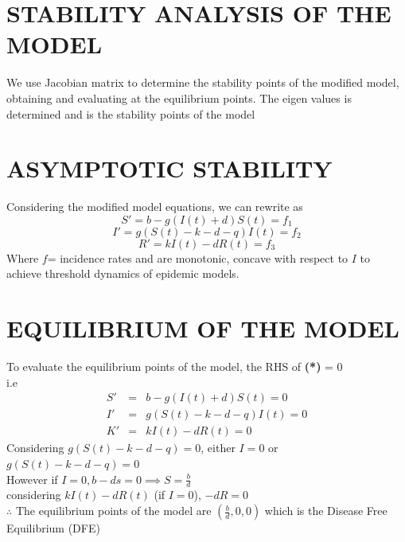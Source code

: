 \documentclass[12pt]{report}
\newcommand{\bt}[1]{\textbf{#1}}
\newcommand{\dsp}{\displaystyle}
\begin{document}
	  \section{STABILITY ANALYSIS OF THE MODEL}
	  We use Jacobian matrix to determine the stability points of the modified model,  obtaining and evaluating at the equilibrium points. The eigen values is determined and is the stability points of the model  
  
	\section{ASYMPTOTIC STABILITY}
	 Considering the modified model equations, we can rewrite as
	 \begin{equation}
	  	S' = b - g(I(t) +d)S(t) = f_1 \nonumber
	 \end{equation}
	\begin{equation}
		I' = g(S(t) - k-d-q)I(t) = f_2 \tag{*} \label{eq:ast}
	\end{equation}
	\begin{equation}
		R' = kI(t) - dR(t) = f_3 \nonumber
	\end{equation}
	Where $f$= incidence rates and are monotonic, concave with respect to $I$ to achieve threshold dynamics of epidemic models.
	
	\section{EQUILIBRIUM OF THE MODEL}
	To evaluate the equilibrium points of the model, the RHS of \bt{(*)} = 0\\
	i.e\\
	\begin{eqnarray*}
		S' &=& b-g(I(t)+d)S(t) = 0\\
		I' &=& g(S(t)-k-d-q)I(t) = 0\\
		K' &=& kI(t) - dR(t) = 0
	\end{eqnarray*}
	Considering $g(S(t) - k-d-q) = 0$, either $I=0$ or $g(S(t)-k-d-q)=0$\\
	However if $\dsp I=0, b-ds=0 \implies S=\frac{b}{d}$\\
	considering $kI(t) - dR(t)$ (if $I=0$), $-dR=0$\\
	$\therefore$ The equilibrium points of the model are $\dsp (\frac{b}{d}, 0,0)$ which is the Disease Free Equilibrium (DFE) \\
	
\end{document}
